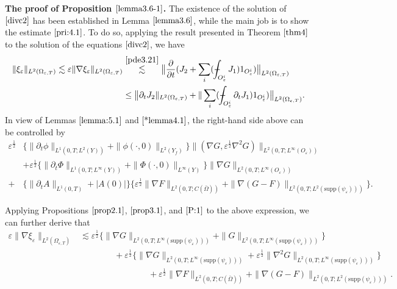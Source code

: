 \documentclass[13pt,CJK]{article}
\theoremstyle{plain}                       %
\theoremstyle{remark}
\numberwithin{equation}{section}
\def\Xint#1{\mathchoice
  {\XXint\displaystyle\textstyle{#1}}%
  {\XXint\textstyle\scriptstyle{#1}}%
  {\XXint\scriptstyle\scriptscriptstyle{#1}}%
  {\XXint\scriptscriptstyle\scriptscriptstyle{#1}}%
  \!\int}
\def\XXint#1#2#3{{\setbox0=\hbox{$#1{#2#3}{\int}$}
  \vcenter{\hbox{$#2#3$}}\kern-.5\wd0}}
\def\dashint{\Xint-}
\begin{document}
\noindent
\textbf{The proof of Proposition $\ref{lemma3.6-1}$.}
The existence of the solution of $\eqref{divc2}$ has been established
in Lemma $\ref{lemma3.6}$, while the main job is to show the
estimate $\eqref{pri:4.1}$. To do so, applying the result presented in Theorem
$\ref{thm4}$ to the solution of the equations $\eqref{divc2}$, we have
\begin{equation*}
\begin{aligned}
\|\xi_{\varepsilon}\|_{L^2(\Omega_{\varepsilon,T})}\lesssim
\varepsilon \|\nabla\xi_{\varepsilon}\|_{L^2(\Omega_{\varepsilon,T})}
&\overset{\eqref{pde3.21}}{\lesssim} \big\|\frac{\partial}{\partial t}(J_2+\sum_{i}(\dashint_{O_{\varepsilon}^i}
J_1)1_{O_{\varepsilon}^i})
\big\|_{L^2(\Omega_{\varepsilon,T})}\\
&\leq
\big\|\partial_tJ_2\|_{L^2(\Omega_{\varepsilon,T})}
+
\|\sum_{i}(\dashint_{O_{\varepsilon}^i}\partial_tJ_1)1_{O_{\varepsilon}^i})\big\|_{L^2(\Omega_{\varepsilon,T})}.
\end{aligned}
\end{equation*}
In view of Lemmas $\ref{lemma:5.1}$ and $\ref{*lemma4.1}$,
the right-hand side above can be controlled by
\begin{equation*}
\begin{aligned}
\varepsilon^{\frac{1}{2}}
&\bigg\{\|\partial_t \phi\|_{L^1(0,T;L^2(Y))}
+\|\phi(\cdot,0)\|_{L^2(Y_f)}
\bigg\}
\|(\nabla G,\varepsilon^{\frac{1}{2}}\nabla^2G)\|_{L^2(0,T;L^{\infty}
(O_\varepsilon))}\\
& +\varepsilon^{\frac{1}{2}}
\bigg\{\|\partial_t \Phi\|_{L^1(0,T;L^{\infty}(Y))}+
\|\Phi(\cdot,0)\|_{L^{\infty}(Y)}
\bigg\}
\|\nabla G\|_{L^2(0,T;L^{\infty}
(O_\varepsilon))}\\
+&\Big\{\|\partial_tA\|_{L^1(0,T)}+|A(0)|\Big\}
\bigg\{\varepsilon^{\frac{1}{2}}\|\nabla F\|_{L^2(0,T;C(\bar{\Omega}))}
+\|\nabla(G-F)\|_{
L^2(0,T;L^2{(\text{supp}(\psi_{\varepsilon}))})}\bigg\}.
\end{aligned}
\end{equation*}

Applying Propositions $\ref{prop2.1}$, $\ref{prop3.1}$, and $\ref{P:1}$
to the above expression,  we can further derive that
\begin{equation}\label{f:5.15}
\begin{aligned}
\varepsilon \|\nabla\xi_{\varepsilon}\|_{L^2(\Omega_{\varepsilon,T})}
&\lesssim \varepsilon^{\frac{1}{2}}
\bigg\{
\|\nabla G\|_{L^2(0,T;L^{\infty}
(\text{supp}(\psi_{\varepsilon})))}
+\|G\|_{L^2(0,T;L^{\infty}
(\text{supp}(\psi_{\varepsilon})))}
\bigg\}\\
&\qquad\qquad+\varepsilon^{\frac{1}{2}}
\bigg\{
\|\nabla G\|_{L^2(0,T;L^{\infty}
(\text{supp}(\psi_{\varepsilon})))}
+\varepsilon^{\frac{1}{2}}\|\nabla^2G\|_{L^2(0,T;L^{\infty}
(\text{supp}(\psi_{\varepsilon})))}\bigg\}\\
&\qquad\qquad\qquad\qquad+
\varepsilon^{\frac{1}{2}}\|\nabla F\|_{L^2(0,T;C(\bar{\Omega}))}
+\|\nabla(G-F)\|_{L^2(0,T;L^2{(\text{supp}(\psi_{\varepsilon}))})}.
\end{aligned}
\end{equation}
\end{document}
